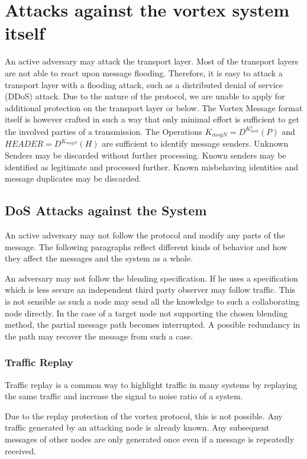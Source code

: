 \section{Attacks against the vortex system itself}
An active adversary may attack the transport layer. Most of the transport layers are not able to react upon message flooding. Therefore, it is easy to attack a transport layer with a flooding attack, such as a distributed denial of service (DDoS) attack. Due to the nature of the protocol, we are unable to apply for additional protection on the transport layer or below. The Vortex Message format itself is however crafted in such a way that only minimal effort is sufficient to get the involved parties of a transmission. The Operations $ K_{msgN}=D^{K^{1}_{host}}\left(P\right)$ and $HEADER=D^{K_{msgN}}\left(H\right)$ are sufficient to identify message senders. Unknown Senders may be discarded without further processing. Known senders may be identified as legitimate and processed further. Known misbehaving identities and message duplicates may be discarded. 


\subsection{DoS Attacks against the System}
An active adversary may not follow the protocol and modify any parts of the message. The following paragraphs reflect different kinds of behavior and how they affect the messages and the system as a whole.

An adversary may not follow the blending specification. If he uses a specification which is less secure an independent third party observer may follow traffic. This is not sensible as such a node may send all the knowledge to such a collaborating node directly. In the case of a  target node not supporting the chosen blending method, the partial message path becomes interrupted. A possible redundancy in the path may recover the message from such a case.

\subsubsection{Traffic Replay}
Traffic replay is a common way to highlight traffic in many systems by replaying the same traffic and increase the signal to noise ratio of a system. 

Due to the replay protection of the vortex protocol, this is not possible. Any traffic generated by an attacking node is already known. Any subsequent messages of other nodes are only generated once even if a message is repeatedly received.

